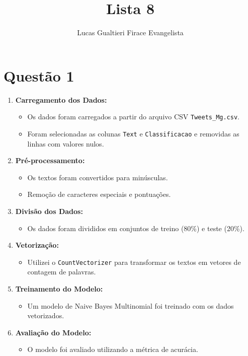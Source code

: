 \documentclass[12pt]{article}
\title{Lista 8}
\author{Lucas Gualtieri Firace Evangelista}
\date{}
\begin{document}
\maketitle

\section*{Questão 1}

\begin{enumerate}[label=\arabic*.]
    \item \textbf{Carregamento dos Dados:}
    \begin{itemize}
        \item Os dados foram carregados a partir do arquivo CSV \texttt{Tweets\_Mg.csv}.
        \item Foram selecionadas as colunas \texttt{Text} e \texttt{Classificacao} e removidas as linhas com valores nulos.
    \end{itemize}

    \item \textbf{Pré-processamento:}
    \begin{itemize}
        \item Os textos foram convertidos para minúsculas.
        \item Remoção de caracteres especiais e pontuações.
    \end{itemize}

    \item \textbf{Divisão dos Dados:}
    \begin{itemize}
        \item Os dados foram divididos em conjuntos de treino (80\%) e teste (20\%).
    \end{itemize}

    \item \textbf{Vetorização:}
    \begin{itemize}
        \item Utilizei o \texttt{CountVectorizer} para transformar os textos em vetores de contagem de palavras.
    \end{itemize}

    \item \textbf{Treinamento do Modelo:}
    \begin{itemize}
        \item Um modelo de Naive Bayes Multinomial foi treinado com os dados vetorizados.
    \end{itemize}

    \item \textbf{Avaliação do Modelo:}
    \begin{itemize}
        \item O modelo foi avaliado utilizando a métrica de acurácia.
    \end{itemize}
\end{enumerate}
\end{document}
